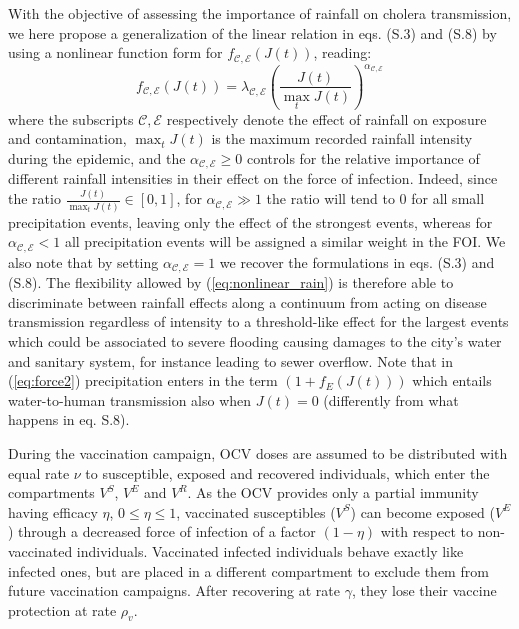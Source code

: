 With the objective of assessing the importance of rainfall on cholera transmission, we here propose a generalization of the linear relation in eqs. (S.3) and (S.8) by using a nonlinear function form for $f_{\mathcal{C,E}}\left(J(t)\right)$, reading:
\begin{equation}
    f_{\mathcal{C,E}}\left(J(t)\right)=\lambda_{\mathcal{C,E}} \left(\frac{J(t)}{\max_t J(t)}\right)^{\alpha_{\mathcal{C,E}}}
    \label{eq:nonlinear_rain}
\end{equation}
where the subscripts $\mathcal{C,E}$ respectively denote the effect of rainfall on exposure and contamination, $\max_t J(t)$ is the maximum recorded rainfall intensity during the epidemic, and the $\alpha_{\mathcal{C,E}}\ge0$ controls for the relative importance of different rainfall intensities in their effect on the force of infection. Indeed, since the ratio $\frac{J(t)}{\max_t J(t)} \in [0,1]$, for $\alpha_{\mathcal{C,E}} \gg 1$ the ratio will tend to 0 for all small precipitation events, leaving only the effect of the strongest events, whereas for $\alpha_{\mathcal{C,E}} < 1$ all precipitation events will be assigned a similar weight in the FOI. We also note that by setting $\alpha_{\mathcal{C,E}} = 1$ we recover the formulations in eqs. (S.3) and (S.8). The flexibility allowed by (\ref{eq:nonlinear_rain}) is therefore able to discriminate between rainfall effects along a continuum from acting on disease transmission regardless of intensity to a threshold-like effect for the largest events which could be associated to severe flooding causing damages to the city's water and sanitary system, for instance leading to sewer overflow.
Note that in (\ref{eq:force2}) precipitation enters in the term $\left(1+f_E \left(J(t)\right)\right)$ which entails water-to-human transmission also when $J(t)=0$ (differently from what happens in eq. S.8).

During the vaccination campaign, OCV doses are assumed to be distributed with equal rate $\nu$ to susceptible, exposed and recovered individuals, which enter the compartments $V^S$, $V^E$ and $V^R$. As the OCV provides only a partial immunity having efficacy $\eta$, $0\leq \eta \leq 1$, vaccinated susceptibles ($V^S$) can become exposed ($V^E$) through a decreased force of infection of a factor $(1-\eta)$ with respect to non-vaccinated individuals. Vaccinated infected individuals behave exactly like infected ones, but are placed in a different compartment to exclude them from future vaccination campaigns. After recovering at  rate $\gamma$, they lose their vaccine protection at rate $\rho_{v}$.


